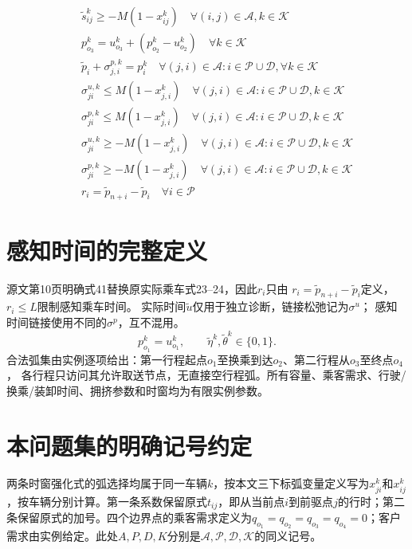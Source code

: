 \documentclass[11pt]{ctexart}
\begin{document}
\begin{align*}
& \quad \tilde{s}_{ij}^k \ge -M(1 - x_{ij}^k) \quad \forall (i, j) \in \mathcal{A}, k \in \mathcal{K} \\
& \quad p_{o_3}^k = u_{o_3}^k + (p_{o_2}^k - u_{o_2}^k) \quad \forall k \in \mathcal{K} \\
& \quad \tilde{p}_i + \sigma_{j, i}^{p,k} = p_i^k \quad \forall (j, i) \in \mathcal{A}: i \in \mathcal{P} \cup \mathcal{D}, \forall k \in \mathcal{K} \\
& \quad \sigma_{j i}^{u,k} \le M(1 - x_{j, i}^k) \quad \forall (j, i) \in \mathcal{A}: i \in \mathcal{P} \cup \mathcal{D}, k \in \mathcal{K} \\
& \quad \sigma_{j i}^{p,k} \le M(1 - x_{j, i}^k) \quad \forall (j, i) \in \mathcal{A}: i \in \mathcal{P} \cup \mathcal{D}, k \in \mathcal{K} \\
& \quad \sigma_{j i}^{u,k} \ge -M(1 - x_{j, i}^k) \quad \forall (j, i) \in \mathcal{A}: i \in \mathcal{P} \cup \mathcal{D}, k \in \mathcal{K} \\
& \quad \sigma_{j i}^{p,k} \ge -M(1 - x_{j, i}^k) \quad \forall (j, i) \in \mathcal{A}: i \in \mathcal{P} \cup \mathcal{D}, k \in \mathcal{K} \\
& \quad r_i = \tilde{p}_{n+i} - \tilde{p}_i \quad \forall i \in \mathcal{P}
\end{align*}


\section*{感知时间的完整定义}
源文第10页明确式41替换原实际乘车式23--24，因此$r_i$只由
$r_i=\tilde p_{n+i}-\tilde p_i$定义，$r_i\le L$限制感知乘车时间。
实际时间$\tilde u$仅用于独立诊断，链接松弛记为$\sigma^u$；
感知时间链接使用不同的$\sigma^p$，互不混用。
\[
p_{o_1}^k=u_{o_1}^k,\qquad\tilde\eta^k,\tilde\theta^k\in\{0,1\}.
\]
合法弧集由实例逐项给出：第一行程起点$o_1$至换乘到达$o_2$、第二行程从$o_3$至终点$o_4$，
各行程只访问其允许取送节点，无直接空行程弧。所有容量、乘客需求、行驶/换乘/装卸时间、拥挤参数和时窗均为有限实例参数。

\section*{本问题集的明确记号约定}
两条时窗强化式的弧选择均属于同一车辆$k$，按本文三下标弧变量定义写为$x_{ji}^k$和$x_{ij}^k$，按车辆分别计算。第一条系数保留原式$t_{ij}$，即从当前点$i$到前驱点$j$的行时；第二条保留原式的加号。四个边界点的乘客需求定义为$q_{o_1}=q_{o_2}=q_{o_3}=q_{o_4}=0$；客户需求由实例给定。此处$A,P,D,K$分别是$\mathcal A,\mathcal P,\mathcal D,\mathcal K$的同义记号。
\end{document}
